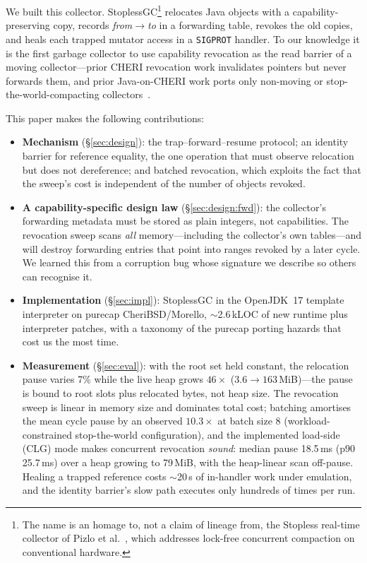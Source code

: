 \documentclass[acmsmall,nonacm,screen]{acmart}
\begin{document}
We built this collector. StoplessGC\footnote{The name is an homage to,
not a claim of lineage from, the Stopless real-time collector of Pizlo
et al.~\cite{pizlo-stopless}, which addresses lock-free concurrent
compaction on conventional hardware.} relocates Java objects with a
capability-preserving copy, records \emph{from}$\to$\emph{to} in a
forwarding table, revokes the old copies, and heals each trapped
mutator access in a \texttt{SIGPROT} handler. To our knowledge it is
the first garbage collector to use capability revocation as the read
barrier of a moving collector---prior CHERI revocation work invalidates
pointers but never forwards them, and prior Java-on-CHERI work ports
only non-moving or stop-the-world-compacting
collectors~\cite{mojo-jvm}.

This paper makes the following contributions:
\begin{itemize}
\item \textbf{Mechanism} (\S\ref{sec:design}): the
  trap--forward--resume protocol; an identity barrier for reference
  equality, the one operation that must observe relocation but does not
  dereference; and batched revocation, which exploits the fact that the
  sweep's cost is independent of the number of objects revoked.
\item \textbf{A capability-specific design law}
  (\S\ref{sec:design:fwd}): the collector's forwarding metadata must be
  stored as plain integers, not capabilities. The revocation sweep
  scans \emph{all} memory---including the collector's own tables---and
  will destroy forwarding entries that point into ranges revoked by a
  later cycle. We learned this from a corruption bug whose signature we
  describe so others can recognise it.
\item \textbf{Implementation} (\S\ref{sec:impl}): StoplessGC in the
  OpenJDK~17 template interpreter on purecap CheriBSD/Morello,
  $\sim$2.6\,kLOC of new runtime plus interpreter patches, with a
  taxonomy of the purecap porting hazards that cost us the most time.
\item \textbf{Measurement} (\S\ref{sec:eval}): with the root set held
  constant, the relocation pause varies 7\% while the live heap grows
  $46\times$ ($3.6\to163$\,MiB)---the pause is bound to root slots
  plus relocated bytes, not heap size.
  The revocation sweep is linear in memory size and dominates total
  cost; batching amortises the mean cycle pause by an observed $10.3\times$
  at batch size 8 (workload-constrained stop-the-world configuration),
  and the implemented load-side (CLG) mode makes concurrent revocation
  \emph{sound}: median pause 18.5\,ms (p90 25.7\,ms) over a heap
  growing to 79\,MiB, with the heap-linear scan off-pause. Healing a trapped reference costs $\sim$20\,\textmu s of in-handler
  work under emulation, and the identity barrier's slow path executes only
  hundreds of times per run.
\end{itemize}
\end{document}
